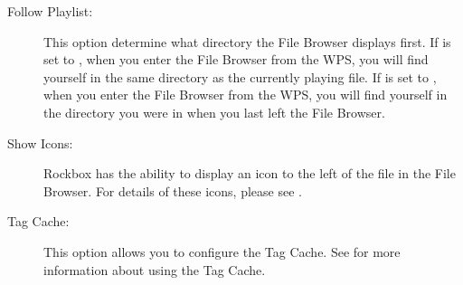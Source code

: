 \begin{description}
  \item[Follow Playlist:] 
  This option determine what directory the File Browser 
  displays first.  If  is set to , when 
  you enter the File Browser from the WPS, you will find yourself in the same 
  directory as the currently playing file.  If  is set 
  to , when you enter the File Browser from the WPS, you will find 
  yourself in the directory you were in when you last left the File Browser.
    
  \item[Show Icons:]
    Rockbox has the ability to display an icon to the left of the file 
    in the File Browser.  For details of these icons, please see
    .
    
  \item[Tag Cache:]
    This option allows you to configure the Tag Cache.
    See  for more information about using
    the Tag Cache.
    
  \end{description}
